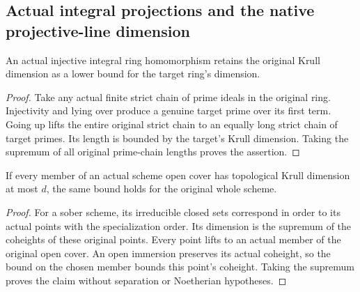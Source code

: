 \subsection{Actual integral projections and the native projective-line dimension}

\begin{lemma}
\label{lem:actual-injective-integral-ring-dimension-bound}
\leanok
An actual injective integral ring homomorphism retains the original
Krull dimension as a lower bound for the target ring's dimension.
\end{lemma}
\begin{proof}
Take any actual finite strict chain of prime ideals in the original
ring. Injectivity and lying over produce a genuine target prime over
its first term. Going up lifts the entire original strict chain to
an equally long strict chain of target primes. Its length is bounded
by the target's Krull dimension. Taking the supremum of all original
prime-chain lengths proves the assertion.
\end{proof}

\begin{lemma}
\label{lem:actual-open-cover-scheme-dimension-bound}
\leanok
If every member of an actual scheme open cover has topological Krull
dimension at most $d$, the same bound holds for the original whole scheme.
\end{lemma}
\begin{proof}
For a sober scheme, its irreducible closed sets correspond in order
to its actual points with the specialization order. Its dimension is
the supremum of the coheights of these original points. Every point
lifts to an actual member of the original open cover. An open
immersion preserves its actual coheight, so the bound on the chosen
member bounds this point's coheight. Taking the supremum proves the
claim without separation or Noetherian hypotheses.
\end{proof}

